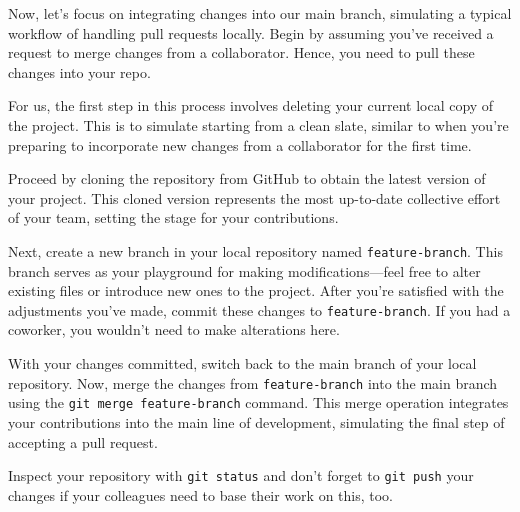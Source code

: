 \documentclass{dcbl/challenge}
\begin{document}
\begin{aufgabe}
   Now, let's focus on integrating changes into our main branch, simulating a typical workflow of handling pull requests locally. Begin by assuming you've received a request to merge changes from a collaborator. Hence, you need to pull these changes into your repo.
   
   For us, the first step in this process involves deleting your current local copy of the project. This is to simulate starting from a clean slate, similar to when you're preparing to incorporate new changes from a collaborator for the first time.
    
    Proceed by cloning the repository from GitHub to obtain the latest version of your project. This cloned version represents the most up-to-date collective effort of your team, setting the stage for your contributions.
    
    Next, create a new branch in your local repository named \texttt{feature-branch}. This branch serves as your playground for making modifications—feel free to alter existing files or introduce new ones to the project. After you're satisfied with the adjustments you've made, commit these changes to \texttt{feature-branch}. If you had a coworker, you wouldn't need to make alterations here.
    
    With your changes committed, switch back to the main branch of your local repository. Now, merge the changes from \texttt{feature-branch} into the main branch using the \texttt{git merge feature-branch} command. This merge operation integrates your contributions into the main line of development, simulating the final step of accepting a pull request.

    Inspect your repository with \texttt{git status} and don't forget to \texttt{git push} your changes if your colleagues need to base their work on this, too.
\end{aufgabe}
\end{document}
